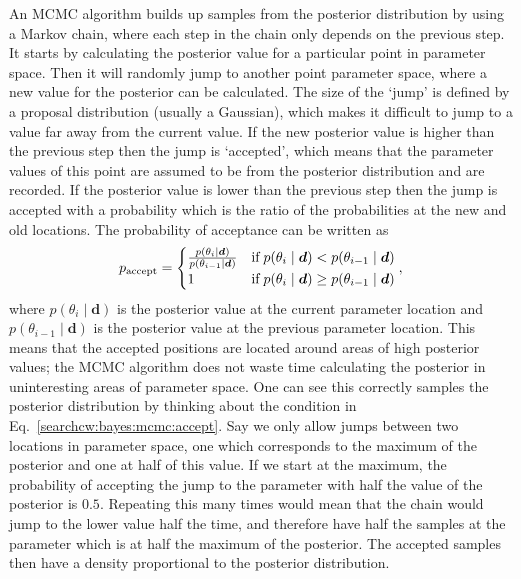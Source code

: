 An \gls{MCMC} algorithm
builds up samples from the posterior distribution by using a Markov chain, where each
step in the chain only depends on the previous step.  
It starts by calculating the posterior value for a particular point in parameter space. Then it will
randomly jump to another point parameter space, where a new value for the
posterior can be calculated.  The size of the `jump' is defined by a proposal distribution (usually a Gaussian), which makes it difficult to jump to a value far away from the current value. If the new posterior value is higher than the
previous step then the jump is `accepted', which means that the parameter
values of this point are assumed to be from the posterior distribution and are recorded.  If the posterior value is lower than the
previous step then the jump is accepted with a probability which is the ratio of the probabilities at the new and old locations.
The probability of acceptance can be written as
\begin{equation}
\label{searchcw:bayes:mcmc:accept}
	p_{\rm{accept}} = 
	\begin{cases}
		\frac{p(\theta_i \mid \bm{d})}{p(\theta_{i-1} \mid \bm{d})} & \text{if} \; p(\theta_i \mid \bm{d}) < p(\theta_{i-1} \mid \bm{d}) \\
		1 & \text{if} \; p(\theta_i \mid \bm{d}) \geq p(\theta_{i-1} \mid \bm{d}) \\
	\end{cases},
\end{equation}
where $p(\theta_i \mid \bm{d})$ is the posterior value at the current parameter location and $p(\theta_{i-1} \mid \bm{d})$ is the posterior value at the previous parameter location. 
This means that the accepted positions are located around areas of high
posterior values; the \gls{MCMC} algorithm does not waste time calculating the
posterior in uninteresting areas of parameter space.  
One can see this correctly samples the posterior distribution by thinking about the condition in Eq.~\ref{searchcw:bayes:mcmc:accept}. Say we only allow jumps between two locations in parameter space, one which corresponds to the maximum of the posterior and one at half of this value. 
If we start at the maximum, the probability of accepting the jump to the parameter with half the value of the posterior is $0.5$. Repeating this many times would mean that the chain would jump to the lower value half the time, and therefore have half the samples at the parameter which is at half the maximum of the posterior. 
The accepted samples then have a density proportional to the posterior distribution. 
